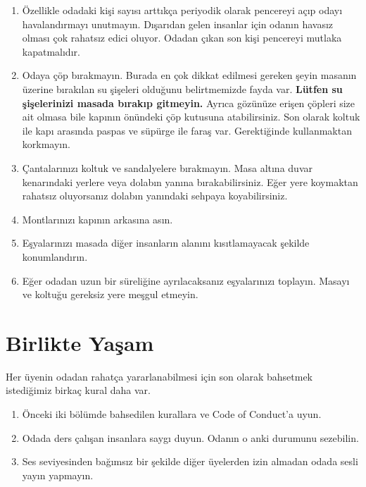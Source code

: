 \documentclass{article}
\begin{document}
\begin{enumerate}
	\item Özellikle odadaki kişi sayısı arttıkça periyodik olarak pencereyi açıp odayı havalandırmayı unutmayın. Dışarıdan gelen insanlar için odanın havasız olması çok rahatsız edici oluyor. Odadan çıkan son kişi pencereyi mutlaka kapatmalıdır.
	\item Odaya çöp bırakmayın. Burada en çok dikkat edilmesi gereken şeyin masanın üzerine bırakılan su şişeleri olduğunu belirtmemizde fayda var. \textbf{Lütfen su şişelerinizi masada bırakıp gitmeyin.} Ayrıca gözünüze erişen çöpleri size ait olmasa bile kapının önündeki çöp kutusuna atabilirsiniz. Son olarak koltuk ile kapı arasında paspas ve süpürge ile faraş var. Gerektiğinde kullanmaktan korkmayın.
	\item Çantalarınızı koltuk ve sandalyelere bırakmayın. Masa altına duvar kenarındaki yerlere veya dolabın yanına bırakabilirsiniz. Eğer yere koymaktan rahatsız oluyorsanız dolabın yanındaki sehpaya koyabilirsiniz.
	\item Montlarınızı kapının arkasına asın.
	\item Eşyalarınızı masada diğer insanların alanını kısıtlamayacak şekilde konumlandırın.
	\item Eğer odadan uzun bir süreliğine ayrılacaksanız eşyalarınızı toplayın. Masayı ve koltuğu gereksiz yere meşgul etmeyin.
\end{enumerate}

\section{Birlikte Yaşam}
Her üyenin odadan rahatça yararlanabilmesi için son olarak bahsetmek istediğimiz birkaç kural daha var.
\begin{enumerate}
	\item Önceki iki bölümde bahsedilen kurallara ve Code of Conduct'a uyun.
	\item Odada ders çalışan insanlara saygı duyun. Odanın o anki durumunu sezebilin.
	\item Ses seviyesinden bağımsız bir şekilde diğer üyelerden izin almadan odada sesli yayın yapmayın.
\end{enumerate}
	
\end{document}
